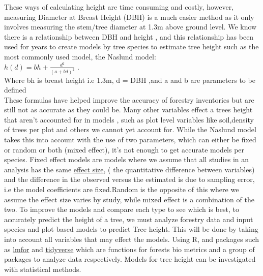 \documentclass[a4paper,11pt,twoside]{report}
\begin{document}
\newpage
These ways of calculating height are time consuming and costly, however, measuring Diameter
at Breast Height (DBH) is a much easier method as it only involves measuring the stem/tree diameter at 1.3m above ground level. We know there is a relationship between DBH and height \cite{10.1093/treephys/tps127}, and this relationship has been used for years to create models by tree species to estimate tree height such as the most commonly used model, the Naslund model:\\ $h(d)=bh + \frac{d^2}{(a+bd)^2}$ \cite{naslund1936skogsforsoksanstaltens}.\\ Where bh is breast height i.e 1.3m, d = DBH ,and a and b are parameters to be defined\\
These formulas have helped improve the accuracy of forestry inventories but are still not as accurate as they could be. Many other variables effect a trees height that aren’t accounted for in models \cite{doi:10.1080/21580103.2014.957354}, such as plot level variables like soil,density of trees per plot and others we cannot yet account for. While the Naslund model takes this into account with the use of two parameters, which can either be fixed or random or both (mixed effect), it’s not enough to get accurate models per species. Fixed effect models are models where we assume that all studies in an analysis has the same \href{https://www.leeds.ac.uk/educol/documents/00002182.htm}{effect size}, ( the quantitative difference between variables) and the difference in the observed versus the estimated is due to sampling error, i.e the model coefficients are fixed.Random is the opposite of this where we assume the effect size varies by study, while mixed effect is a combination of the two.\cite{borenstein2010basic} To improve the models and compare each type to see which is best, to accurately predict the height of a tree, we must analyze forestry data and input species and plot-based models to predict Tree height. This will be done by taking into account all variables that may effect the models. Using R, and packages such as \href{https://cran.r-project.org/web/packages/lmfor/lmfor.pdf}{lmfor} and \href{https://cran.r-project.org/web/packages/tidyverse/tidyverse.pdf}{tidyverse} which are functions for forests bio metrics and a group of packages to analyze data respectively. Models for tree height can be investigated with statistical methods.\newpage
\end{document}
